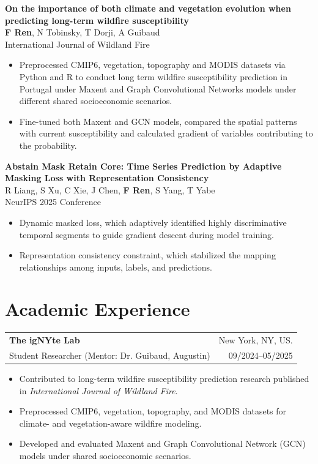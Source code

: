 \documentclass[10pt,letterpaper]{article}
\makeatletter
\newcommand{\entry}[4]{%
  \begin{tabularx}{\textwidth}{@{}Xr@{}}
    \textbf{#1} & #3 \\
    #2 & #4 \\
  \end{tabularx}
}
\newcommand{\pubtitle}[1]{\textbf{#1}\\}
\makeatother
\begin{document}
\vspace{3pt}
\pubtitle{On the importance of both climate and vegetation evolution when predicting long-term wildfire susceptibility}
\textbf{F Ren}, N Tobinsky, T Dorji, A Guibaud\\
International Journal of Wildland Fire
\begin{itemize}
  \item Preprocessed CMIP6, vegetation, topography and MODIS datasets via Python and R to conduct long term wildfire susceptibility prediction in Portugal under Maxent and Graph Convolutional Networks models under different shared socioeconomic scenarios.
  \item Fine-tuned both Maxent and GCN models, compared the spatial patterns with current susceptibility and calculated gradient of variables contributing to the probability.
\end{itemize}

\vspace{2pt}
\pubtitle{Abstain Mask Retain Core: Time Series Prediction by Adaptive Masking Loss with Representation Consistency}
R Liang, S Xu, C Xie, J Chen, \textbf{F Ren}, S Yang, T Yabe\\
NeurIPS 2025 Conference
\begin{itemize}
  \item Dynamic masked loss, which adaptively identified highly discriminative temporal segments to guide gradient descent during model training.
  \item Representation consistency constraint, which stabilized the mapping relationships among inputs, labels, and predictions.
\end{itemize}

\section*{Academic Experience}
\entry{The igNYte Lab}{Student Researcher (Mentor: Dr. Guibaud, Augustin)}{New York, NY, US.}{09/2024--05/2025}
\begin{itemize}
  \item Contributed to long-term wildfire susceptibility prediction research published in \textit{International Journal of Wildland Fire}.
  \item Preprocessed CMIP6, vegetation, topography, and MODIS datasets for climate- and vegetation-aware wildfire modeling.
  \item Developed and evaluated Maxent and Graph Convolutional Network (GCN) models under shared socioeconomic scenarios.
\end{itemize}
\end{document}
